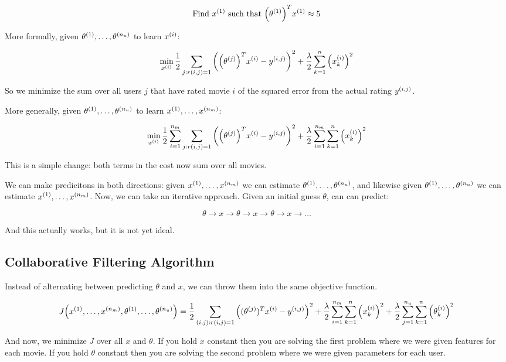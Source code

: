\[
    \text{Find } x_{}^{(1)} \text{ such that } \qty(\theta_{}^{(1)})^T x_{}^{(1)} \approx 5
\]

More formally, given $\theta_{}^{(1)}, \dots, \theta_{}^{(n_u)}$ to learn $x_{}^{(i)}$:

\[
    \min_{x_{}^{(i)}}
    \frac{1}{2} \sum_{ j:r(i,j)=1 } \qty(
        \qty(\theta_{}^{(j)})^T x_{}^{(i)} - y_{}^{(i,j)}
    )^2 +
    \frac{\lambda}{2} \sum_{k=1}^n \qty( x_{k}^{(i)} )^2
\]

So we minimize the sum over all users $j$ that have rated movie $i$
of the squared error from the actual rating $y_{}^{(i,j)}$.

More generally, given $\theta_{}^{(1)}, \dots, \theta_{}^{(n_u)}$ to learn $x_{}^{(1)}, \dots, x_{}^{(n_m)}$:

\[
    \min_{x_{}^{(i)}}
    \frac{1}{2} \sum_{i=1}^{n_m} \sum_{ j:r(i,j)=1 } \qty(
        \qty(\theta_{}^{(j)})^T x_{}^{(i)} - y_{}^{(i,j)}
    )^2 +
    \frac{\lambda}{2} \sum_{i=1}^{n_m} \sum_{k=1}^n \qty( x_{k}^{(i)} )^2
\]

This is a simple change: both terms in the cost now sum over all movies.

We can make predicitons in both directions:
given $x_{}^{(1)}, \dots, x_{}^{(n_m)}$ we can estimate $\theta_{}^{(1)}, \dots, \theta_{}^{(n_u)}$,
and likewise given $\theta_{}^{(1)}, \dots, \theta_{}^{(n_u)}$ we can estimate $x_{}^{(1)}, \dots, x_{}^{(n_m)}$.
Now, we can take an iterative approach.  Given an initial guess $\theta$, can can predict:

\[ \theta \to x \to \theta \to x \to \theta \to x \to \dots \]

And this actually works, but it is not yet ideal.

\subsection{Collaborative Filtering Algorithm}

Instead of alternating between predicting $\theta$ and $x$, we can throw them into the same objective function.

\[
    J\qty( x_{}^{(1)}, \dots, x_{}^{(n_m)}, \theta_{}^{(1)}, \dots, \theta_{}^{(n_u)} ) = 
    \frac{1}{2} \sum_{(i,j) : r(i,j) = 1} \qty(
        (\theta_{}^{(j)})^T x_{}^{(i)} - y_{}^{(i,j)}
    )^2 +
    \frac{\lambda}{2} \sum_{i=1}^{n_m} \sum_{k=1}^n \qty( x_{k}^{(i)} )^2 + 
    \frac{\lambda}{2} \sum_{j=1}^{n_u} \sum_{k=1}^n \qty( \theta_{k}^{(i)} )^2
\]

And now, we minimize $J$ over all $x$ and $\theta$.
If you hold $x$ constant then you are solving the first problem where we were given features for each movie.
If you hold $\theta$ constant then you are solving the second problem where we were given parameters for each user.

